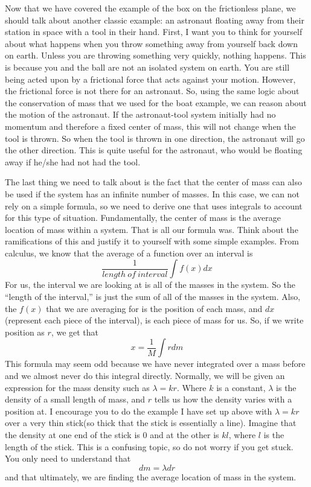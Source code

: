 Now that we have covered the example of the box on the frictionless plane, we should talk about another classic example: an astronaut floating away from their station in space with a tool in their hand. First, I want you to think for yourself about what happens when you throw something away from yourself back down on earth. Unless you are throwing something very quickly, nothing happens. This is because you and the ball are not an isolated system on earth. You are still being acted upon by a frictional force that acts against your motion. However, the frictional force is not there for an astronaut. So, using the same logic about the conservation of mass that we used for the boat example, we can reason about the motion of the astronaut. If the astronaut-tool system initially had no momentum and therefore a fixed center of mass, this will not change when the tool is thrown. So when the tool is thrown in one direction, the astronaut will go the other direction. This is quite useful for the astronaut, who would be floating away if he/she had not had the tool. 

The last thing we need to talk about is the fact that the center of mass can also be used if the system has an infinite number of masses. In this case, we can not rely on a simple formula, so we need to derive one that uses integrals to account for this type of situation. Fundamentally, the center of mass is the average location of mass within a system. That is all our formula was. Think about the ramifications of this and justify it to yourself with some simple examples. From calculus, we know that the average of a function over an interval is $$\frac{1}{length \ of \ interval}\int{f\left(x\right) dx}$$ For us, the interval we are looking at is all of the masses in the system. So the “length of the interval,” is just the sum of all of the masses in the system. Also, the $f\left(x\right)$ that we are averaging for is the position of each mass, and $dx$(represent each piece of the interval), is each piece of mass for us. So, if we write position as $r$, we get that \begin{equation}x=\frac{1}{M}\int{rdm}\end{equation} This formula may seem odd because we have never integrated over a mass before and we almost never do this integral directly. Normally, we will be given an expression for the mass density such as $\lambda=kr$. Where $k$ is a constant, $\lambda$ is the density of a small length of mass, and $r$ tells us how the density varies with a position at. I encourage you to do the example I have set up above with $\lambda=kr$ over a very thin stick(so thick that the stick is essentially a line). Imagine that the density at one end of the stick is 0 and at the other is $kl$, where $l$ is the length of the stick. This is a confusing topic, so do not worry if you get stuck. You only need to understand that $$dm=\lambda dr$$ and that ultimately, we are finding the average location of mass in the system. 

\pagebreak